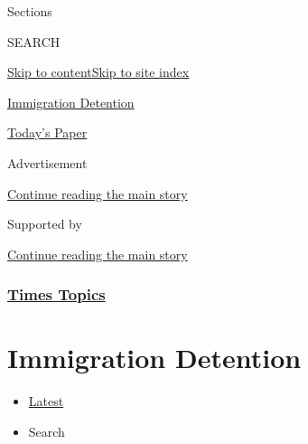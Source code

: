 Sections

SEARCH

\protect\hyperlink{site-content}{Skip to
content}\protect\hyperlink{site-index}{Skip to site index}

\href{https://www.nytimes3xbfgragh.onion/topic/subject/immigration-detention}{Immigration
Detention}

\href{https://myaccount.nytimes3xbfgragh.onion/auth/login?response_type=cookie\&client_id=vi}{}

\href{https://www.nytimes3xbfgragh.onion/section/todayspaper}{Today's
Paper}

Advertisement

\protect\hyperlink{after-top}{Continue reading the main story}

Supported by

\protect\hyperlink{after-sponsor}{Continue reading the main story}

\hypertarget{times-topics}{%
\subsubsection{\texorpdfstring{\href{/index.html}{Times
Topics}}{Times Topics}}\label{times-topics}}

\hypertarget{immigration-detention}{%
\section{Immigration Detention}\label{immigration-detention}}

\begin{itemize}
\tightlist
\item
  \protect\hyperlink{stream-panel}{Latest}
\item
  Search
\end{itemize}

